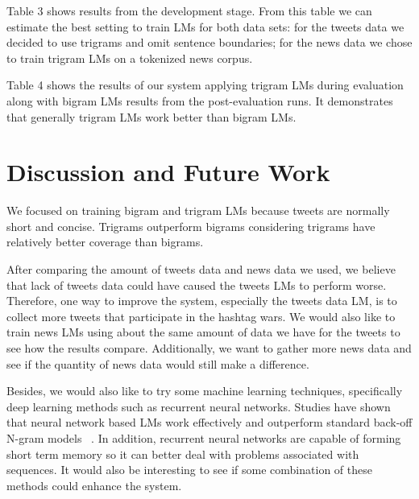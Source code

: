 \documentclass[11pt,a4paper]{article}
\begin{document}
Table 3 shows results from the development stage. From this table we can estimate the best setting to train LMs for both data sets: for the tweets data we decided to use trigrams and omit sentence boundaries; for the news data we chose to train trigram LMs on a tokenized news corpus.

Table 4 shows the results of our system applying trigram LMs during evaluation along with bigram LMs results from the post-evaluation runs. It demonstrates that generally trigram LMs work better than bigram LMs.


\section{Discussion and Future Work}
We focused on training bigram and trigram LMs because tweets are normally short and concise. Trigrams outperform bigrams considering trigrams have relatively better coverage than bigrams. 

After comparing the amount of tweets data and news data we used, we believe that lack of tweets data could have caused the tweets LMs to perform worse. Therefore, one way to improve the system, especially the tweets data LM, is to collect more tweets that participate in the hashtag wars. We would also like to train news LMs using about the same amount of data we have for the tweets to see how the results compare. Additionally, we want to gather more news data and see if the quantity of news data would still make a difference. 

Besides, we would also like to try some machine learning techniques, specifically deep learning methods such as recurrent neural networks. Studies have shown that neural network based LMs work effectively and outperform standard back-off N-gram models ~\cite{mikolov2011extensions}. In addition, recurrent neural networks are capable of forming short term memory so it can better deal with problems associated with sequences. It would also be interesting to see if some combination of these methods could enhance the system.




%
%


\end{document}
